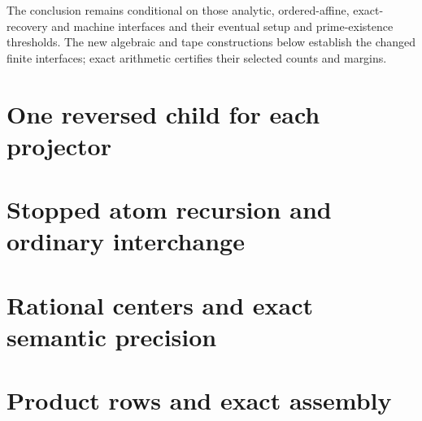 \documentclass[11pt]{article}
\begin{document}
The conclusion remains conditional on those analytic, ordered-affine,
exact-recovery and machine interfaces and their eventual setup and
prime-existence thresholds. The new algebraic and tape constructions
below establish the changed finite interfaces; exact arithmetic certifies
their selected counts and margins.

\section{One reversed child for each projector}

\section{Stopped atom recursion and ordinary interchange}

\section{Rational centers and exact semantic precision}

\section{Product rows and exact assembly}

\end{document}
